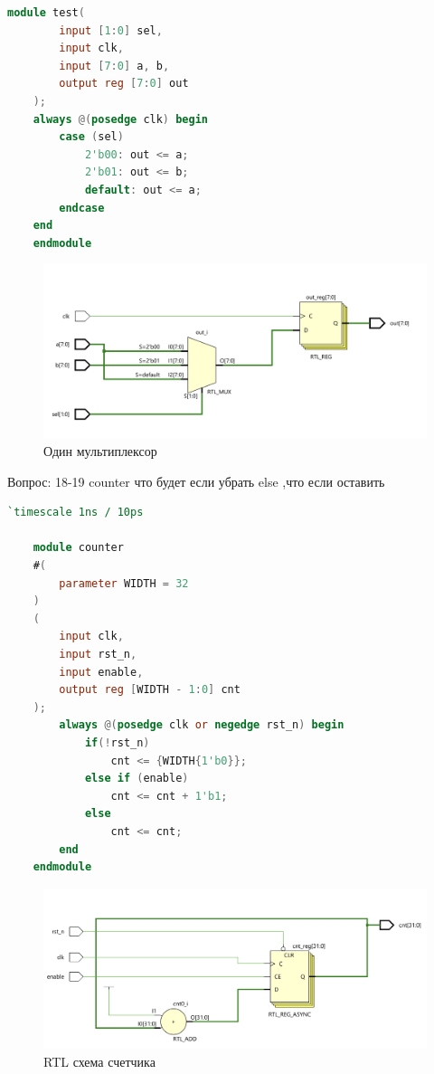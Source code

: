 \documentclass[12pt,onecolumn]{article}
\begin{document}
\begin{itemize}
\begin{lstlisting}[language=verilog]
    module test(
        input [1:0] sel,
        input clk,
        input [7:0] a, b,
        output reg [7:0] out
    );
    always @(posedge clk) begin
        case (sel)
            2'b00: out <= a;
            2'b01: out <= b;
            default: out <= a;
        endcase
    end
    endmodule
\end{lstlisting}
\begin{figure}[H]
    \centering
    \includegraphics[width=\textwidth]{image/seq-2.png}
    \caption{Один мультиплексор}
\end{figure}

\end{itemize}

Вопрос: 18-19 counter что будет если убрать else ,что если оставить 
\begin{lstlisting}[language=verilog]
    `timescale 1ns / 10ps

    module counter 
    #(
        parameter WIDTH = 32
    )
    (
        input clk,
        input rst_n,
        input enable,
        output reg [WIDTH - 1:0] cnt
    );
        always @(posedge clk or negedge rst_n) begin
            if(!rst_n)
                cnt <= {WIDTH{1'b0}};
            else if (enable)
                cnt <= cnt + 1'b1;
            else
                cnt <= cnt;
        end
    endmodule
\end{lstlisting}
\begin{figure}[H]
    \centering
    \includegraphics[width=\textwidth]{image/counter-new.png}
    \caption{RTL схема счетчика}
\end{figure}
\end{document}
